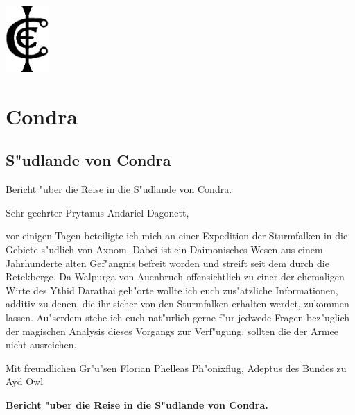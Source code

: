 \documentclass[a5paper,8pt]{book}
\begin{document}
\begin{flushright}
\includegraphics[height=1in]{pictures/Cordo_Siegel.png}
\end{flushright}

\newpage


\chapter{Condra}

\section{S"udlande von Condra}

Bericht "uber die Reise in die S"udlande von Condra.

Sehr geehrter Prytanus Andariel Dagonett,

vor einigen Tagen beteiligte ich mich an einer Expedition der Sturmfalken in die Gebiete s"udlich von Axnom. Dabei ist ein Daimonisches Wesen aus einem Jahrhunderte alten 
Gef"angnis befreit worden und streift seit dem durch die Retekberge. Da Walpurga von Auenbruch offensichtlich zu einer der ehemaligen Wirte des Ythid Darathai geh"orte wollte 
ich euch zus"atzliche Informationen, additiv zu denen, die ihr sicher von den Sturmfalken erhalten werdet, zukommen lassen. Au"serdem stehe ich euch nat"urlich gerne f"ur 
jedwede Fragen bez"uglich der magischen Analysis dieses Vorgangs zur Verf"ugung, sollten die der Armee nicht ausreichen.

Mit freundlichen Gr"u"sen
Florian Phelleas Ph"onixflug, Adeptus des Bundes zu Ayd Owl

\newpage

\textbf{Bericht "uber die Reise in die S"udlande von Condra.}\\
\end{document}
